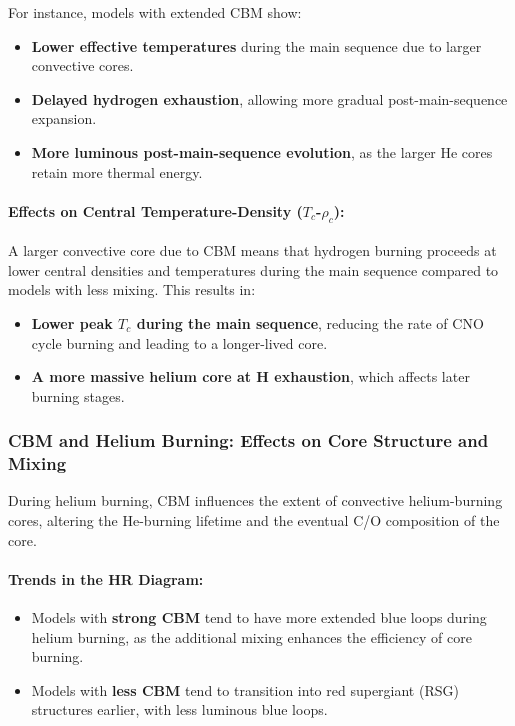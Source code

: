 For instance, models with extended CBM show:
\begin{itemize}
    \item \textbf{Lower effective temperatures} during the main sequence due to larger convective cores.
    \item \textbf{Delayed hydrogen exhaustion}, allowing more gradual post-main-sequence expansion.
    \item \textbf{More luminous post-main-sequence evolution}, as the larger He cores retain more thermal energy.
\end{itemize}

\paragraph{Effects on Central Temperature-Density ($T_c$-$\rho_c$):}
A larger convective core due to CBM means that hydrogen burning proceeds at lower central densities and temperatures during the main sequence compared to models with less mixing. This results in:
\begin{itemize}
    \item \textbf{Lower peak $T_c$ during the main sequence}, reducing the rate of CNO cycle burning and leading to a longer-lived core.
    \item \textbf{A more massive helium core at H exhaustion}, which affects later burning stages.
\end{itemize}

\subsubsection{CBM and Helium Burning: Effects on Core Structure and Mixing}

During helium burning, CBM influences the extent of convective helium-burning cores, altering the He-burning lifetime and the eventual C/O composition of the core.

\paragraph{Trends in the HR Diagram:}
\begin{itemize}
    \item Models with \textbf{strong CBM} tend to have more extended blue loops during helium burning, as the additional mixing enhances the efficiency of core burning.
    \item Models with \textbf{less CBM} tend to transition into red supergiant (RSG) structures earlier, with less luminous blue loops.
\end{itemize}

